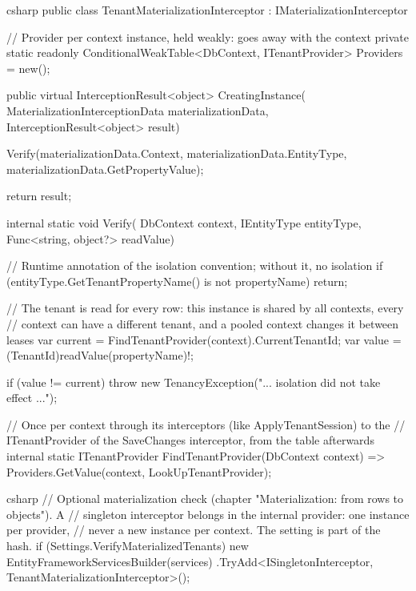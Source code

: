 \begin{sourcecode}{csharp}
public class TenantMaterializationInterceptor : IMaterializationInterceptor
{
    // Provider per context instance, held weakly: goes away with the context
    private static readonly ConditionalWeakTable<DbContext, ITenantProvider> Providers =
        new();

    public virtual InterceptionResult<object> CreatingInstance(
        MaterializationInterceptionData materializationData,
        InterceptionResult<object> result)
    {
        Verify(materializationData.Context, materializationData.EntityType,
            materializationData.GetPropertyValue);

        return result;
    }

    internal static void Verify(
        DbContext context, IEntityType entityType, Func<string, object?> readValue)
    {
        // Runtime annotation of the isolation convention; without it, no isolation
        if (entityType.GetTenantPropertyName() is not { } propertyName)
            return;

        // The tenant is read for every row: this instance is shared by all contexts, every
        // context can have a different tenant, and a pooled context changes it between leases
        var current = FindTenantProvider(context).CurrentTenantId;
        var value = (TenantId)readValue(propertyName)!;

        if (value != current)
            throw new TenancyException("... isolation did not take effect ...");
    }

    // Once per context through its interceptors (like ApplyTenantSession) to the
    // ITenantProvider of the SaveChanges interceptor, from the table afterwards
    internal static ITenantProvider FindTenantProvider(DbContext context)
        => Providers.GetValue(context, LookUpTenantProvider);
}
\end{sourcecode}

\begin{sourcecode}{csharp}
// Optional materialization check (chapter "Materialization: from rows to objects"). A
// singleton interceptor belongs in the internal provider: one instance per provider,
// never a new instance per context. The setting is part of the hash.
if (Settings.VerifyMaterializedTenants)
    new EntityFrameworkServicesBuilder(services)
        .TryAdd<ISingletonInterceptor, TenantMaterializationInterceptor>();
\end{sourcecode}

